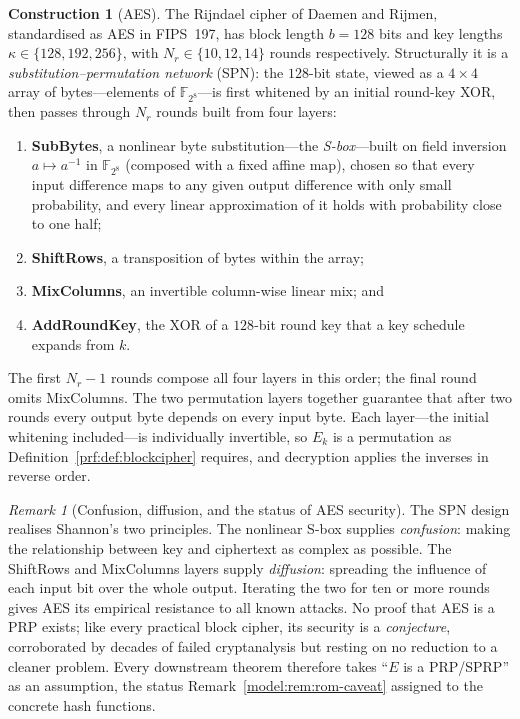\documentclass[11pt,a4paper]{article}
\theoremstyle{definition}
\newtheorem{construction}[theorem]{Construction}
\theoremstyle{remark}
\newtheorem{remark}[theorem]{Remark}
\newcommand{\F}{\ensuremath{\mathbb{F}}}
\begin{document}
\begin{construction}[AES]\label{prf:con:aes}
The Rijndael cipher of Daemen and Rijmen, standardised as AES in
FIPS~197, has block length \(b = 128\) bits and key lengths
\(\kappa \in \{128, 192, 256\}\), with \(N_{r} \in \{10, 12, 14\}\)
rounds respectively. Structurally it is a
\emph{substitution--permutation network} (SPN): the \(128\)-bit
state, viewed as a \(4 \times 4\) array of bytes---elements of
\(\F_{2^{8}}\)---is first whitened by an initial round-key XOR, then
passes through \(N_{r}\) rounds built from four layers:
\begin{enumerate}
\item \textbf{SubBytes}, a nonlinear byte substitution---the
  \emph{S-box}---built on field inversion \(a \mapsto a^{-1}\) in
  \(\F_{2^{8}}\) (composed with a fixed affine map), chosen so that
  every input difference maps to any given output difference with
  only small probability, and every linear approximation of it holds
  with probability close to one half;
\item \textbf{ShiftRows}, a transposition of bytes within the array;
\item \textbf{MixColumns}, an invertible column-wise linear mix; and
\item \textbf{AddRoundKey}, the XOR of a \(128\)-bit round key that a
  key schedule expands from \(k\).
\end{enumerate}
The first \(N_{r} - 1\) rounds compose all four layers in this order;
the final round omits MixColumns. The two permutation layers together
guarantee that after two rounds every output byte depends on every
input byte. Each layer---the initial whitening included---is
individually invertible, so \(E_{k}\) is a permutation as
Definition~\ref{prf:def:blockcipher} requires, and decryption applies
the inverses in reverse order.
\end{construction}

\begin{remark}[Confusion, diffusion, and the status of AES security]
\label{prf:rem:confusiondiffusion}
The SPN design realises Shannon's two principles.
The nonlinear S-box supplies \emph{confusion}: making the relationship
between key and ciphertext as complex as possible. The ShiftRows and
MixColumns layers supply \emph{diffusion}: spreading the influence of each
input bit over the whole output. Iterating the two for ten or more
rounds gives AES its empirical resistance to all known
attacks. No proof that AES is a PRP exists; like every practical block
cipher, its security is a \emph{conjecture}, corroborated by decades
of failed cryptanalysis but resting on no reduction to a cleaner
problem. Every downstream theorem therefore takes ``\(E\) is a
PRP/SPRP'' as an assumption, the status
Remark~\ref{model:rem:rom-caveat} assigned to the concrete hash
functions.
\end{remark}
\end{document}
